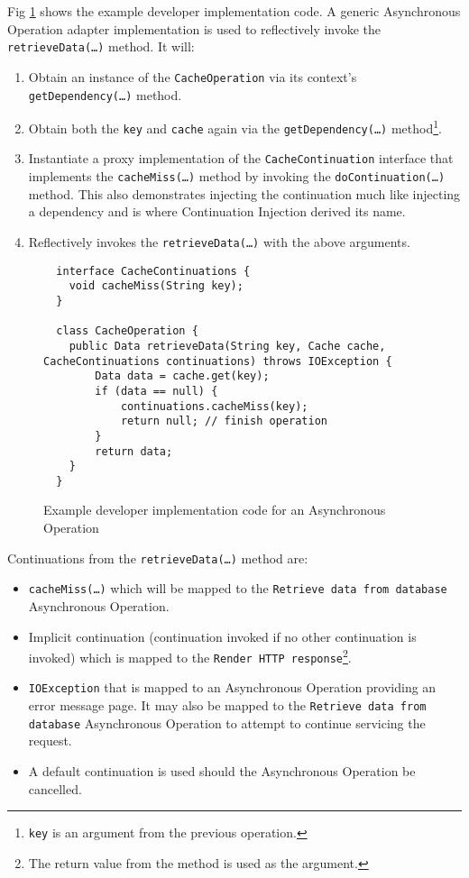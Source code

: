 \documentclass[prodmode]{style/acmlarge}
\begin{document}
Fig \ref{fig:Example_Method_Operation} shows the example developer
implementation code.  A generic Asynchronous Operation adapter implementation is
used to reflectively invoke the \texttt{retrieveData(\ldots)} method. It will:
\begin{enumerate}
  \item Obtain an instance of the \texttt{CacheOperation} via its context's \texttt{getDependency(\ldots)} method.
  \item Obtain both the \texttt{key} and \texttt{cache} again via the \texttt{getDependency(\ldots)} method\footnote{\texttt{key} is an argument from the previous operation.}.
  \item Instantiate a proxy implementation of the \texttt{CacheContinuation} interface that implements the \texttt{cacheMiss(\ldots)} method by invoking the \texttt{doContinuation(\ldots)} method.  This also demonstrates injecting the continuation much like injecting a dependency and is where Continuation Injection derived its name. 
  \item Reflectively invokes the \texttt{retrieveData(\ldots)} with the above arguments.
\end{enumerate}

\begin{figure}[tp]
\centering
\begin{verbatim}
  interface CacheContinuations {
    void cacheMiss(String key);
  }

  class CacheOperation {    
    public Data retrieveData(String key, Cache cache, CacheContinuations continuations) throws IOException {
        Data data = cache.get(key);
        if (data == null) {
            continuations.cacheMiss(key);
            return null; // finish operation
        }
        return data;
    }
  }
\end{verbatim}
\caption{Example developer implementation code for an Asynchronous Operation}
\label{fig:Example_Method_Operation}
\end{figure}

Continuations from the \texttt{retrieveData(\ldots)} method are:
\begin{itemize}
  \item \texttt{cacheMiss(\ldots)} which will be mapped to the \texttt{Retrieve data from database} Asynchronous Operation.
  \item Implicit continuation (continuation invoked if no other continuation is invoked) which is mapped to the \texttt{Render HTTP response}\footnote{The return value from the method is used as the argument.}.
  \item \texttt{IOException} that is mapped to an Asynchronous Operation providing an error message page.  It may also be mapped to the \texttt{Retrieve data from database} Asynchronous Operation to attempt to continue servicing the request.
  \item A default continuation is used should the Asynchronous Operation be cancelled.
\end{itemize}
\end{document}
